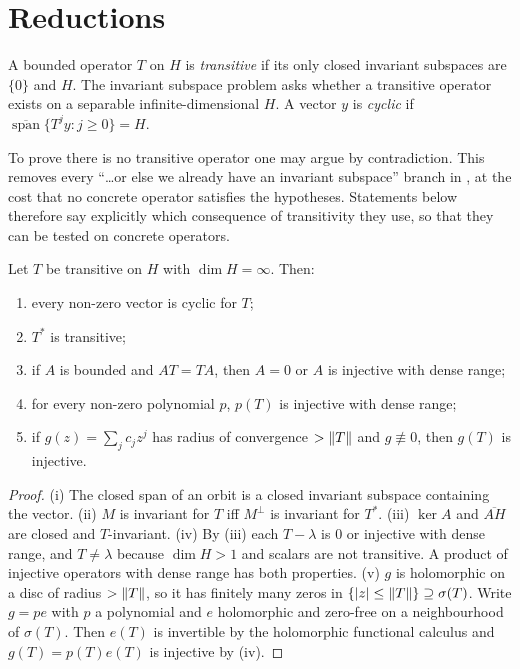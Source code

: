 \section{Reductions}\label{sec:reductions}

\begin{definition}
A bounded operator $T$ on $H$ is \emph{transitive} if its only closed invariant subspaces are
$\{0\}$ and $H$. The invariant subspace problem asks whether a transitive operator exists on a
separable infinite-dimensional $H$. A vector $y$ is \emph{cyclic} if
$\overline{\operatorname{span}}\{T^jy:j\ge0\}=H$.
\end{definition}

To prove there is no transitive operator one may argue by contradiction. This removes every
``\dots or else we already have an invariant subspace'' branch in \paper{}, at the cost that no
concrete operator satisfies the hypotheses. Statements below therefore say explicitly which
consequence of transitivity they use, so that they can be tested on concrete operators.

\begin{lemma}\label{lem:transitive}\stproved{}
Let $T$ be transitive on $H$ with $\dim H=\infty$. Then:
\begin{enumerate}[label=(\roman*)]
\item every non-zero vector is cyclic for $T$;
\item $T^*$ is transitive;
\item if $A$ is bounded and $AT=TA$, then $A=0$ or $A$ is injective with dense range;
\item for every non-zero polynomial $p$, $p(T)$ is injective with dense range;
\item if $g(z)=\sum_jc_jz^j$ has radius of convergence $>\lVert T\rVert$ and $g\not\equiv0$, then
$g(T)$ is injective.
\end{enumerate}
\end{lemma}
\begin{proof}
(i) The closed span of an orbit is a closed invariant subspace containing the vector.
(ii) $M$ is invariant for $T$ iff $M^\perp$ is invariant for $T^*$.
(iii) $\ker A$ and $\overline{AH}$ are closed and $T$-invariant.
(iv) By (iii) each $T-\lambda$ is $0$ or injective with dense range, and $T\ne\lambda$ because
$\dim H>1$ and scalars are not transitive. A product of injective operators with dense range has
both properties.
(v) $g$ is holomorphic on a disc of radius $>\lVert T\rVert$, so it has finitely many zeros in
$\{|z|\le\lVert T\rVert\}\supseteq\sigma(T)$. Write $g=pe$ with $p$ a polynomial and $e$ holomorphic and
zero-free on a neighbourhood of $\sigma(T)$. Then $e(T)$ is invertible by the holomorphic
functional calculus and $g(T)=p(T)e(T)$ is injective by (iv).
\end{proof}


